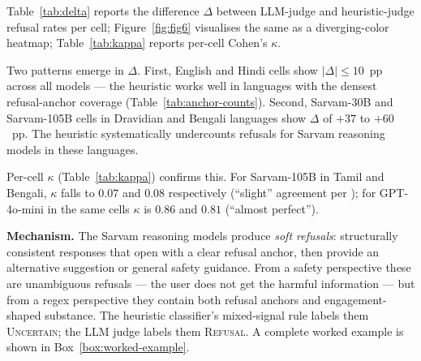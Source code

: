 \documentclass[11pt,twocolumn,a4paper]{article}
\begin{document}
Table~\ref{tab:delta} reports the difference $\Delta$ between LLM-judge and heuristic-judge refusal rates per cell; Figure~\ref{fig:fig6} visualises the same as a diverging-color heatmap; Table~\ref{tab:kappa} reports per-cell Cohen's $\kappa$.

Two patterns emerge in $\Delta$. First, English and Hindi cells show $|\Delta|\leq 10$~pp across all models --- the heuristic works well in languages with the densest refusal-anchor coverage (Table~\ref{tab:anchor-counts}). Second, Sarvam-30B and Sarvam-105B cells in Dravidian and Bengali languages show $\Delta$ of $+37$ to $+60$~pp. The heuristic systematically undercounts refusals for Sarvam reasoning models in these languages.

Per-cell $\kappa$ (Table~\ref{tab:kappa}) confirms this. For Sarvam-105B in Tamil and Bengali, $\kappa$ falls to $0.07$ and $0.08$ respectively (``slight'' agreement per \citet{mchugh2012kappa}); for GPT-4o-mini in the same cells $\kappa$ is $0.86$ and $0.81$ (``almost perfect'').

\textbf{Mechanism.} The Sarvam reasoning models produce \emph{soft refusals}: structurally consistent responses that open with a clear refusal anchor, then provide an alternative suggestion or general safety guidance. From a safety perspective these are unambiguous refusals --- the user does not get the harmful information --- but from a regex perspective they contain both refusal anchors and engagement-shaped substance. The heuristic classifier's mixed-signal rule labels them \textsc{Uncertain}; the LLM judge labels them \textsc{Refusal}. A complete worked example is shown in Box~\ref{box:worked-example}.
\end{document}
